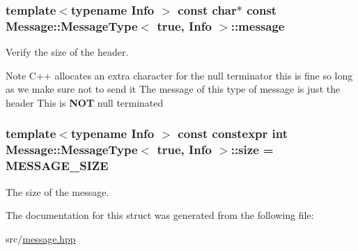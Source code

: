 \subsubsection[{\texorpdfstring{message}{message}}]{\setlength{\rightskip}{0pt plus 5cm}template$<$typename Info $>$ const char$\ast$ const {\bf Message\+::\+Message\+Type}$<$ true, Info $>$\+::message\hspace{0.3cm}{\ttfamily [static]}}\hypertarget{struct_message_1_1_message_type_3_01true_00_01_info_01_4_a8ec12f51c4311bf137bc356da823255a}{}\label{struct_message_1_1_message_type_3_01true_00_01_info_01_4_a8ec12f51c4311bf137bc356da823255a}


Verify the size of the header. 

Note C++ allocates an extra character for the null terminator this is fine so long as we make sure not to send it The message of this type of message is just the header This is {\bfseries N\+OT} null terminated 
\subsubsection[{\texorpdfstring{size}{size}}]{\setlength{\rightskip}{0pt plus 5cm}template$<$typename Info $>$ const constexpr int {\bf Message\+::\+Message\+Type}$<$ true, Info $>$\+::size = {\bf M\+E\+S\+S\+A\+G\+E\+\_\+\+S\+I\+ZE}\hspace{0.3cm}{\ttfamily [static]}}\hypertarget{struct_message_1_1_message_type_3_01true_00_01_info_01_4_a2cc4f5dbfaba4502c6209e73836c96f1}{}\label{struct_message_1_1_message_type_3_01true_00_01_info_01_4_a2cc4f5dbfaba4502c6209e73836c96f1}


The size of the message. 



The documentation for this struct was generated from the following file\+:\begin{DoxyCompactItemize}
\item 
src/\hyperlink{message_8hpp}{message.\+hpp}\end{DoxyCompactItemize}
